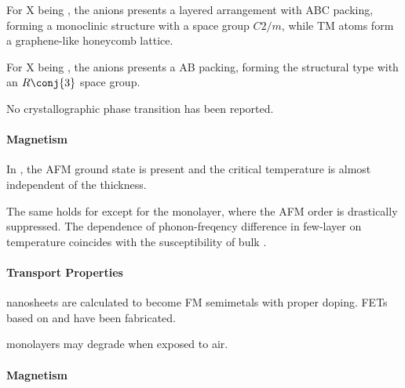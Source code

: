 \documentclass[hidelinks]{article}
\let\oldce\ce
\def\ce#1{{\textsf{\color{dcyan}\oldce{#1}}}}
\begin{document}
For X being , the \ce{S} anions presents a layered arrangement with ABC packing, forming a  monoclinic structure with a space group $C2/m$, while TM atoms form a graphene-like honeycomb lattice.
\par
For X being , the \ce{Se} anions presents a AB packing, forming the  structural type with an $R\conj{3}$ space group.
\par
No crystallographic phase transition has been reported.


\label{ssub:2d_layers}

\paragraph{Magnetism} %
\label{par:magnetism}

In , the AFM ground state is present and the critical temperature is almost independent of the thickness.
\par
The same holds for  except for the monolayer, where the AFM order is drastically suppressed. The dependence of phonon-freqency difference in few-layer  on temperature coincides with the susceptibility of bulk .


\paragraph{Transport Properties} %
\label{par:transport_properties}

 nanosheets are calculated to become FM semimetals with proper doping. FETs based on  and  have been fabricated.



\label{ssub:2d_layers}

 monolayers may degrade when exposed to air.

\paragraph{Magnetism} %
\label{par:magnetism}
\end{document}
